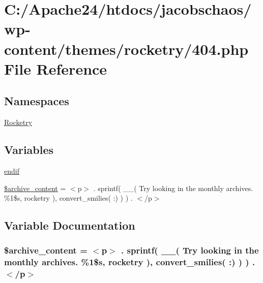 \hypertarget{404_8php}{}\section{C\+:/\+Apache24/htdocs/jacobschaos/wp-\/content/themes/rocketry/404.php File Reference}
\label{404_8php}
\subsection*{Namespaces}
\begin{DoxyCompactItemize}
\item 
 \hyperlink{namespace_rocketry}{Rocketry}
\end{DoxyCompactItemize}
\subsection*{Variables}
\begin{DoxyCompactItemize}
\item 
\hyperlink{404_8php_a82cd33ca97ff99f2fcc5e9c81d65251b}{endif}
\item 
\hyperlink{404_8php_a934e1ba6f106b6729968191b35317d81}{\$archive\+\_\+content} = \textquotesingle{}$<$p$>$\textquotesingle{} . sprintf( \+\_\+\+\_\+( \textquotesingle{}Try looking in the monthly archives. \%1\$s\textquotesingle{}, \textquotesingle{}rocketry\textquotesingle{} ), convert\+\_\+smilies( \textquotesingle{}\+:)\textquotesingle{} ) ) . \textquotesingle{}$<$/p$>$\textquotesingle{}
\end{DoxyCompactItemize}


\subsection{Variable Documentation}
\hypertarget{404_8php_a934e1ba6f106b6729968191b35317d81}{}
\subsubsection[{\$archive\+\_\+content}]{\setlength{\rightskip}{0pt plus 5cm}\$archive\+\_\+content = \textquotesingle{}$<$p$>$\textquotesingle{} . sprintf( \+\_\+\+\_\+( \textquotesingle{}Try looking in the monthly archives. \%1\$s\textquotesingle{}, \textquotesingle{}rocketry\textquotesingle{} ), convert\+\_\+smilies( \textquotesingle{}\+:)\textquotesingle{} ) ) . \textquotesingle{}$<$/p$>$\textquotesingle{}}\label{404_8php_a934e1ba6f106b6729968191b35317d81}



